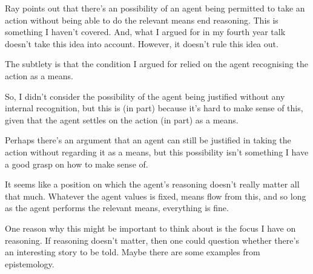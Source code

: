 \documentclass[10pt]{article}
\begin{document}
Ray points out that there's an possibility of an agent being permitted to take an action without being able to do the relevant means end reasoning.
This is something I haven't covered.
And, what I argued for in my fourth year talk doesn't take this idea into account.
However, it doesn't rule this idea out.

The subtlety is that the condition I argued for relied on the agent recognising the action as a means.

So, I didn't consider the possibility of the agent being justified without any internal recognition, but this is (in part) because it's hard to make sense of this, given that the agent settles on the action (in part) as a means.

Perhaps there's an argument that an agent can still be justified in taking the action without regarding it as a means, but this possibility isn't something I have a good grasp on how to make sense of.

It seems like a position on which the agent's reasoning doesn't really matter all that much.
Whatever the agent values is fixed, means flow from this, and so long as the agent performs the relevant means, everything is fine.

One reason why this might be important to think about is the focus I have on reasoning.
If reasoning doesn't matter, then one could question whether there's an interesting story to be told.
Maybe there are some examples from epistemology.
\end{document}
